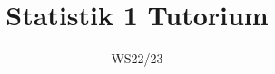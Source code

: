 \documentclass{my_article_class}
\begin{document}
 \ohead{}


\begin{titlepage}

\title{Statistik 1 Tutorium}
\author{}
\date{WS22/23}

\maketitle
\thispagestyle{empty}

\end{titlepage}


\newpage
\tableofcontents
\thispagestyle{empty}


\newpage
\setcounter{page}{1}






\newpage



%
%


\end{document}
